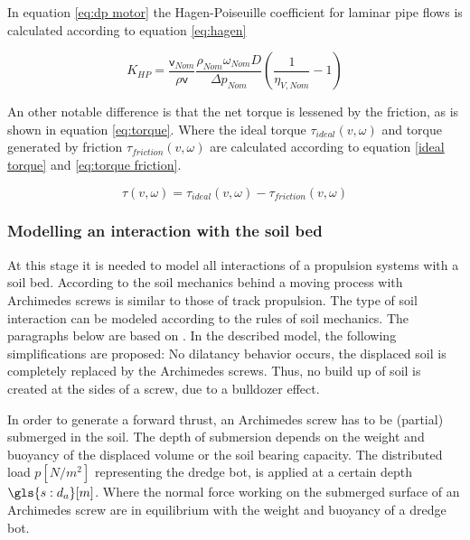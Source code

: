 \noindent In equation \ref{eq:dp motor} the Hagen-Poiseuille coefficient for laminar pipe flows is calculated according to equation \ref{eq:hagen}
\begin{sBox}
	\begin{equation}\label{eq:hagen}
		K_{HP} = \frac{\mathsf{v}_{Nom}}{\rho \mathsf{v}} \frac{\rho_{Nom} \omega_{Nom} D}{\Delta p_{Nom}} \left(\frac{1}{\eta_{V,Nom}} - 1\right)
	\end{equation}
\end{sBox}

\noindent An other notable difference is that the net torque is lessened by the friction, as is shown in equation \ref{eq:torque}. Where the ideal torque $ \tau_{ideal}(v,\omega) $ and torque generated by friction $ \tau_{friction}(v,\omega) $ are calculated according to equation \ref{ideal torque} and \ref{eq:torque friction}.
\begin{sBox}
	\begin{equation}\label{eq:torque}
		\tau(v,\omega) = \tau_{ideal}(v,\omega) - \tau_{friction}(v,\omega)
	\end{equation}
\end{sBox}

\subsubsection{Modelling an interaction with the soil bed}
At this stage it is needed to model all interactions of a propulsion systems with a soil bed. According to \citet{lotman_applicable_2009} the soil mechanics behind a moving process with Archimedes screws is similar to those of track propulsion. The type of soil interaction can be modeled according to the rules of soil mechanics. The paragraphs below are based on \citet{verruijt_soil_2007}. In the described model, the following simplifications are proposed: No \gls{dilatancy} behavior occurs, the displaced soil is completely replaced by the Archimedes screws. Thus, no build up of soil is created at the sides of a screw, due to a bulldozer effect.

In order to generate a forward thrust, an Archimedes screw has to be (partial) submerged in the soil. The depth of submersion depends on the weight and buoyancy of the displaced volume or the soil bearing capacity. The distributed load $ p [N/m^2] $ representing the dredge bot, is applied at a certain depth $ \gls{s:d_a} [m] $. Where the normal force working on the submerged surface of an Archimedes screw are in equilibrium with the weight and buoyancy of  a dredge bot.


